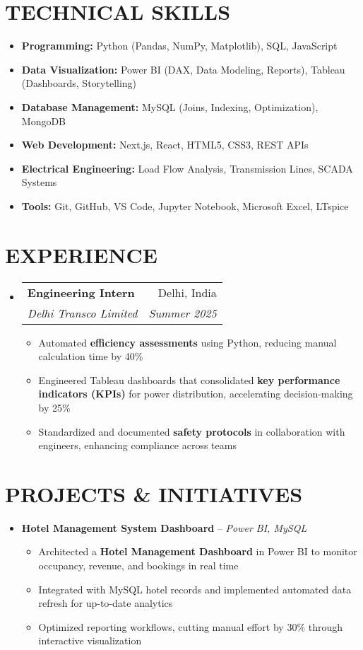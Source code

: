 \documentclass[11pt,a4paper]{article}
\makeatletter
\newcommand{\resumeItem}[1]{\item\small{#1}}
\newcommand{\resumeSubheading}[4]{
  \item
  \begin{tabular*}{\textwidth}{l@{\extracolsep{\fill}}r}
    \textbf{#1} & #2 \\
    \textit{#3} & \textit{#4} \\
  \end{tabular*}
}
\makeatother
\begin{document}
\section{TECHNICAL SKILLS}
\begin{itemize}[leftmargin=0.15in, label={}]
  \resumeItem{\textbf{Programming:} Python (Pandas, NumPy, Matplotlib), SQL, JavaScript}
  \resumeItem{\textbf{Data Visualization:} Power BI (DAX, Data Modeling, Reports), Tableau (Dashboards, Storytelling)}
  \resumeItem{\textbf{Database Management:} MySQL (Joins, Indexing, Optimization), MongoDB}
  \resumeItem{\textbf{Web Development:} Next.js, React, HTML5, CSS3, REST APIs}
  \resumeItem{\textbf{Electrical Engineering:} Load Flow Analysis, Transmission Lines, SCADA Systems}
  \resumeItem{\textbf{Tools:} Git, GitHub, VS Code, Jupyter Notebook, Microsoft Excel, LTspice}
\end{itemize}

\section{EXPERIENCE}
\begin{itemize}[leftmargin=0.15in, label={}]
  \resumeSubheading
    {Engineering Intern}{Delhi, India}
    {Delhi Transco Limited}{Summer 2025}
    \begin{itemize}
        \resumeItem{Automated \textbf{efficiency assessments} using Python, reducing manual calculation time by 40\%}
        \resumeItem{Engineered Tableau dashboards that consolidated \textbf{key performance indicators (KPIs)} for power distribution, accelerating decision-making by 25\%}
        \resumeItem{Standardized and documented \textbf{safety protocols} in collaboration with engineers, enhancing compliance across teams}
    \end{itemize}
\end{itemize}

\section{PROJECTS \& INITIATIVES}
\begin{itemize}[leftmargin=0.15in, label={}]
  \item
  \textbf{Hotel Management System Dashboard} -- \textit{Power BI, MySQL}
    \begin{itemize}
        \resumeItem{Architected a \textbf{Hotel Management Dashboard} in Power BI to monitor occupancy, revenue, and bookings in real time}
        \resumeItem{Integrated with MySQL hotel records and implemented automated data refresh for up-to-date analytics}
        \resumeItem{Optimized reporting workflows, cutting manual effort by 30\% through interactive visualization}
    \end{itemize}
\end{itemize}
\end{document}
